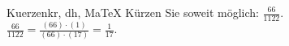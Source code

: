 \begin{MAufgabe}{Kuerzen}{kr, dh, MaTeX}
K\"urzen Sie soweit m\"oglich: $\frac{66}{1122}$.\\ 
\ifLsg\MLoesung
\quad $\frac{66}{1122}=\frac{(66)\cdot(1)}{(66)\cdot(17)}=\frac{1}{17}$.\else\relax\fi
 \end{MAufgabe}